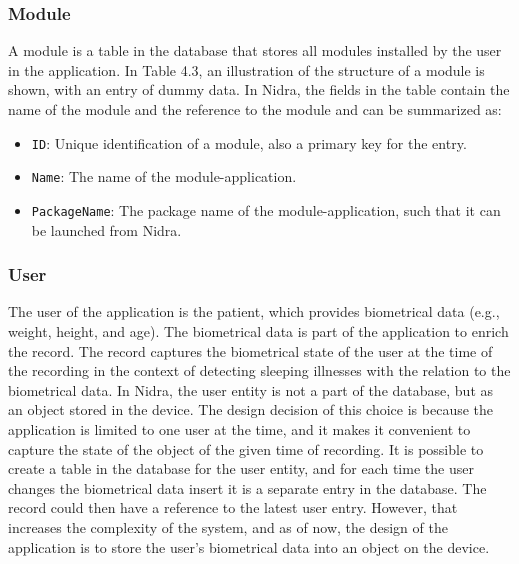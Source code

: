 \subsubsection{Module} \label{ssec:module}
A module is a table in the database that stores all modules installed by the user in the application. In Table 4.3, an illustration of the structure of a module is shown, with an entry of dummy data. In Nidra, the fields in the table contain the name of the module and the reference to the module and can be summarized as: 
\begin{itemize}
    \item \verb|ID|: Unique identification of a module, also a primary key for the entry.
    \item \verb|Name|: The name of the module-application.
    \item \verb|PackageName|: The package name of the module-application, such that it can be launched from Nidra. 
\end{itemize}

\begin{table}
\begin{center}
\caption{Example entry in module table}
\end{center}
\end{table}


\subsubsection{User} \label{ssec:user}
The user of the application is the patient, which provides biometrical data (e.g., weight, height, and age). The biometrical data is part of the application to enrich the record. The record captures the biometrical state of the user at the time of the recording in the context of detecting sleeping illnesses with the relation to the biometrical data. In Nidra, the user entity is not a part of the database, but as an object stored in the device. The design decision of this choice is because the application is limited to one user at the time, and it makes it convenient to capture the state of the object of the given time of recording. It is possible to create a table in the database for the user entity, and for each time the user changes the biometrical data insert it is a separate entry in the database. The record could then have a reference to the latest user entry. However, that increases the complexity of the system, and as of now, the design of the application is to store the user's biometrical data into an object on the device. 

